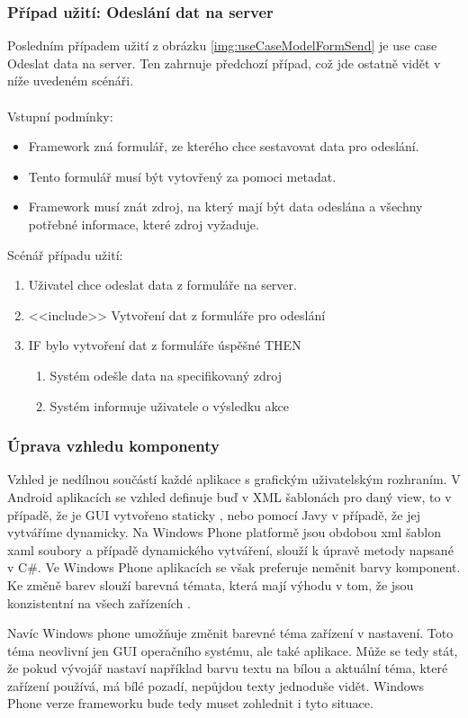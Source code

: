 \subsubsection{Případ užití: Odeslání dat na server}
Posledním případem užití z obrázku \ref{img:useCaseModelFormSend} je use case Odeslat data na server. Ten zahrnuje předchozí případ, což jde ostatně vidět v níže uvedeném scénáři.\\\\
Vstupní podmínky:
\begin{itemize}
\item Framework zná formulář, ze kterého chce sestavovat data pro odeslání.
\item Tento formulář musí být vytovřený za pomoci metadat.
\item Framework musí znát zdroj, na který mají být data odeslána a všechny potřebné informace, které zdroj vyžaduje. 
\end{itemize}
Scénář případu užití:
\begin{enumerate}
\item Uživatel chce odeslat data z formuláře na server.
\item <<include>> Vytvoření dat z formuláře pro odeslání
\item IF bylo vytvoření dat z formuláře úspěšné THEN
\begin{enumerate}
\item Systém odešle data na specifikovaný zdroj
\item Systém informuje uživatele o výsledku akce
\end{enumerate}
\end{enumerate}

\subsubsection{Úprava vzhledu komponenty}
Vzhled je nedílnou součástí každé aplikace s grafickým uživatelským rozhraním. V Android aplikacích se vzhled definuje buď v XML šablonách pro daný view, to v případě, že je GUI vytvořeno staticky \cite{android-themes}, nebo pomocí Javy v případě, že jej vytváříme dynamicky. Na Windows Phone platformě jsou obdobou xml šablon xaml soubory a případě dynamického vytváření, slouží k úpravě metody napsané v C\#. Ve Windows Phone aplikacích se však preferuje neměnit barvy komponent. Ke změně barev slouží barevná témata, která mají výhodu v tom, že jsou konzistentní na všech zařízeních \cite{wp-themes}.

Navíc Windows phone umožňuje změnit barevné téma zařízení v nastavení. Toto téma neovlivní jen GUI operačního systému, ale také aplikace. Může se tedy stát, že pokud vývojář nastaví například barvu textu na bílou a aktuální téma, které zařízení používá, má bílé pozadí, nepůjdou texty jednoduše vidět. Windows Phone verze frameworku bude tedy muset zohlednit i tyto situace.  

